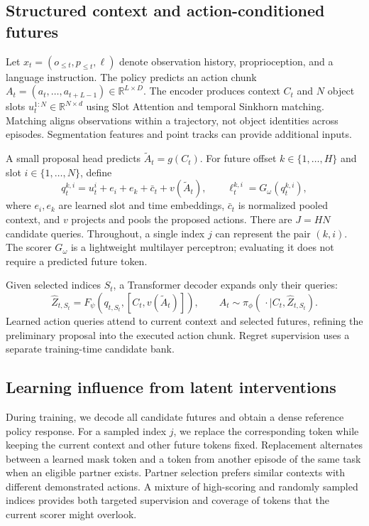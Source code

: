 \documentclass{article}
\begin{document}
\subsection{Structured context and action-conditioned futures}
Let $x_t=(o_{\leq t},p_{\leq t},\ell)$ denote observation history, proprioception, and a language instruction. The policy predicts an action chunk $A_t=(a_t,\ldots,a_{t+L-1})\in\mathbb{R}^{L\times D}$. The encoder produces context $C_t$ and $N$ object slots $u_t^{1:N}\in\mathbb{R}^{N\times d}$ using Slot Attention and temporal Sinkhorn matching. Matching aligns observations within a trajectory, not object identities across episodes. Segmentation features and point tracks can provide additional inputs.

A small proposal head predicts $\widetilde A_t=g(C_t)$. For future offset $k\in\{1,\ldots,H\}$ and slot $i\in\{1,\ldots,N\}$, define
\begin{equation}
q_t^{k,i}=u_t^i+e_i+e_k+\bar c_t+v(\widetilde A_t),
\qquad
\ell_t^{k,i}=G_\omega(q_t^{k,i}),
\label{eq:queries}
\end{equation}
where $e_i,e_k$ are learned slot and time embeddings, $\bar c_t$ is normalized pooled context, and $v$ projects and pools the proposed actions. There are $J=HN$ candidate queries. Throughout, a single index $j$ can represent the pair $(k,i)$. The scorer $G_\omega$ is a lightweight multilayer perceptron; evaluating it does not require a predicted future token.

Given selected indices $S_t$, a Transformer decoder expands only their queries:
\begin{equation}
\widehat Z_{t,S_t}=F_\psi(q_{t,S_t},[C_t,v(\widetilde A_t)]),
\qquad
A_t\sim\pi_\phi(\,\cdot\mid C_t,\widehat Z_{t,S_t}).
\label{eq:sparse}
\end{equation}
Learned action queries attend to current context and selected futures, refining the preliminary proposal into the executed action chunk. Regret supervision uses a separate training-time candidate bank.



\subsection{Learning influence from latent interventions}
\label{sec:influence}
During training, we decode all candidate futures and obtain a dense reference policy response. For a sampled index $j$, we replace the corresponding token while keeping the current context and other future tokens fixed. Replacement alternates between a learned mask token and a token from another episode of the same task when an eligible partner exists. Partner selection prefers similar contexts with different demonstrated actions. A mixture of high-scoring and randomly sampled indices provides both targeted supervision and coverage of tokens that the current scorer might overlook.
\end{document}
